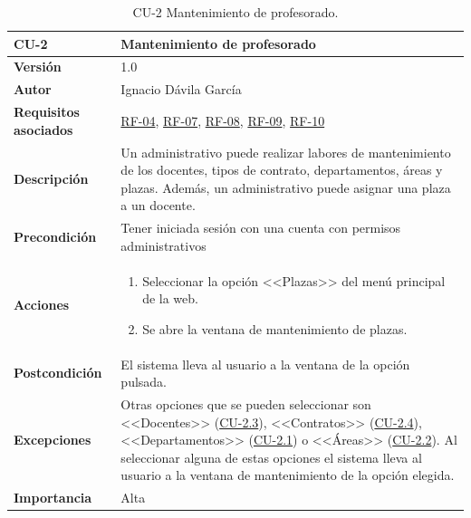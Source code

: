 \begin{table}[p]
\label{table:CU-2}
	\centering
	\begin{tabularx}{\linewidth}{ p{} p{} }
		\toprule
		\textbf{CU-2}    & \textbf{Mantenimiento de profesorado}\\
		\toprule
		\textbf{Versión}              & 1.0    \\
		\textbf{Autor}                & Ignacio Dávila García \\
		\textbf{Requisitos asociados} & \hyperref[itm:RF4]{RF-04}, \hyperref[itm:RF7]{RF-07}, \hyperref[itm:RF8]{RF-08}, \hyperref[itm:RF9]{RF-09}, \hyperref[itm:RF10]{RF-10} \\
		\textbf{Descripción}          & Un administrativo puede realizar labores de mantenimiento de los docentes, tipos de contrato, departamentos, áreas y plazas. Además, un administrativo puede asignar una plaza a un docente. \\
		\textbf{Precondición}         & Tener iniciada sesión con una cuenta con permisos administrativos \\
		\textbf{Acciones}             &
		\begin{enumerate}
			\def\labelenumi{\arabic{enumi}.}
			\tightlist
			\item Seleccionar la opción <<Plazas>> del menú principal de la web.
			\item Se abre la ventana de mantenimiento de plazas.
		\end{enumerate}\\
		\textbf{Postcondición}        & El sistema lleva al usuario a la ventana de la opción pulsada. \\
		\textbf{Excepciones}          & Otras opciones que se pueden seleccionar son <<Docentes>> (\hyperref[table:CU-2.3]{CU-2.3}), <<Contratos>> (\hyperref[table:CU-2.4]{CU-2.4}), <<Departamentos>> (\hyperref[table:CU-2.1]{CU-2.1}) o <<Áreas>> (\hyperref[table:CU-2.2]{CU-2.2}). Al seleccionar alguna de estas opciones el sistema lleva al usuario a la ventana de mantenimiento de la opción elegida.  \\
		\textbf{Importancia}          & Alta \\
		\bottomrule
	\end{tabularx}
	\caption{CU-2 Mantenimiento de profesorado.}
\end{table}
\FloatBarrier

